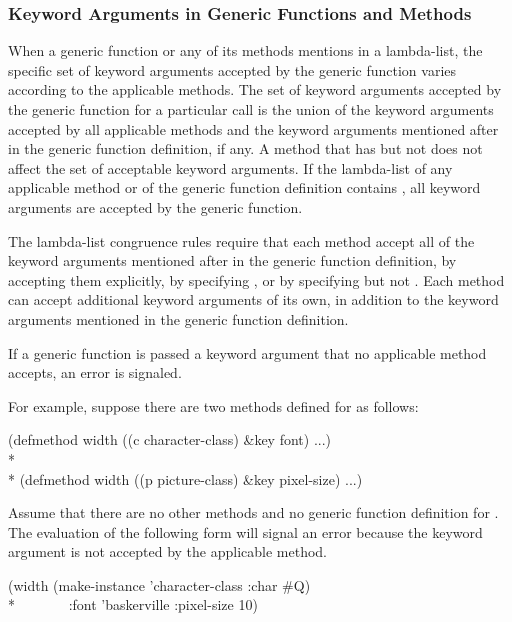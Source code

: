 \subsubsection{Keyword Arguments in Generic Functions and Methods}

When a generic function or any of its methods mentions  in
a lambda-list, the specific set of keyword arguments accepted by the
generic function varies according to the applicable methods.  The set
of keyword arguments accepted by the generic function for a particular
call is the union of the keyword arguments accepted by all applicable
methods and the keyword arguments mentioned after  in the
generic function definition, if any.  A method that has 
but not  does not affect the set of acceptable keyword
arguments.  If the lambda-list of any applicable method or of the
generic function definition contains , all
keyword arguments are accepted by the generic function.

The lambda-list congruence rules require that each method
accept all of the keyword arguments mentioned after  in the
generic function definition, by accepting them explicitly, by
specifying , or by specifying  but
not .  Each method can accept additional keyword arguments
of its own, in addition to the keyword arguments mentioned in the
generic function definition.

If a generic function is passed a keyword argument that no applicable
method accepts, an error is signaled.

For example, suppose there are two methods defined for 
as follows:

\begin{lisp}
(defmethod width ((c character-class) \&key font) ...)\\*
\\*
(defmethod width ((p picture-class) \&key pixel-size) ...)
\end{lisp}

Assume that there are no other methods and no generic
function definition for . The evaluation of the
following form will signal an error because the keyword argument
 is not accepted by the applicable method.

\begin{lisp}
(width (make-instance 'character-class :char \#{\Xbackslash}Q) \\*
~~~~~~~:font 'baskerville :pixel-size 10)
\end{lisp}

